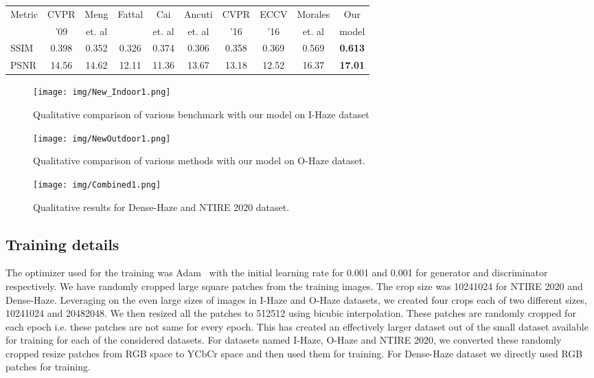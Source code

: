 \documentclass[runningheads]{llncs}
\begin{document}
\begin{table}[t]
\begin{tabular}{|l||c|c|c|c|c|c|c|c|c|}
    \hline
    Metric & CVPR & Meng & Fattal & Cai & Ancuti & CVPR & ECCV & Morales & Our\\
    & '09 \cite{he2010single} & et. al \cite{meng2013efficient} & \cite{fattal3dehazing} & et. al \cite{cai2016dehazenet} & et. al \cite{ancuti2016night} & '16 \cite{berman2016non} & '16 \cite{ren2016single} & et. al \cite{morales2019feature} & model\\
    \hline
    SSIM  & 0.398 & 0.352 & 0.326 & 0.374 & 0.306 & 0.358 & 0.369 & 0.569 & \textbf{0.613}\\
    \hline
    PSNR & 14.56 & 14.62 & 12.11 & 11.36 & 13.67 & 13.18 & 12.52 & 16.37 & \textbf{17.01}\\
    \hline
\end{tabular}
\end{table}

\begin{figure}[t]
\centering
\texttt{[image: img/New\_Indoor1.png]}
\caption{Qualitative comparison of various benchmark with our model on I-Haze dataset}
\label{img:indoor_res}
\end{figure}
\begin{figure}[t]
\centering
\texttt{[image: img/NewOutdoor1.png]}
\caption{Qualitative comparison of various methods with our model on O-Haze dataset.}
\label{img:outdoor_res}
\end{figure}
\begin{figure}[t]
    \centering
    \texttt{[image: img/Combined1.png]}
    \caption{Qualitative results for Dense-Haze and NTIRE 2020 dataset.}
    \label{img:dense}
\end{figure}


\subsection{Training details}
The optimizer used for the training was Adam~\cite{kingma2014adam} with the initial learning rate for 0.001 and 0.001 for generator and discriminator respectively. We have randomly cropped large square patches from the training images. The crop size was 10241024 for NTIRE 2020 and Dense-Haze. Leveraging on the even large sizes of images in I-Haze and O-Haze datasets, we created four crops each of two different sizes, 10241024 and 20482048. We then resized all the patches to 512512 using bicubic interpolation. These patches are randomly cropped for each epoch i.e. these patches are not same for every epoch. This has created an effectively larger dataset out of the small dataset available for training for each of the considered datasets. For datasets named I-Haze, O-Haze and NTIRE 2020, we converted these randomly cropped resize patches from RGB space to YCbCr space and then used them for training. For Dense-Haze dataset we directly used RGB patches for training. 
\end{document}
